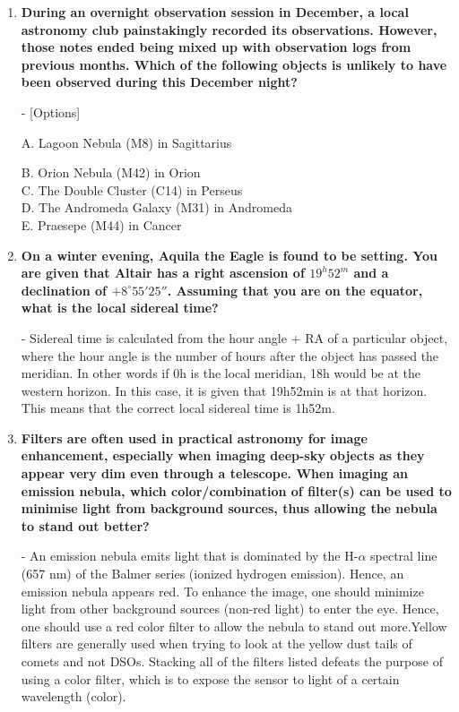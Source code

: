 \documentclass[a4paper,12pt]{extarticle}
\begin{document}
\begin{enumerate}
	
	
	\item \textbf{During an overnight observation session in December, a local astronomy club painstakingly recorded its observations. However, those notes ended being mixed up with observation logs from previous months. Which of the following objects is unlikely to have been observed during this December night?}

- [Options] 
\begin{sol}
	A. {\color{red} Lagoon Nebula (M8) in Sagittarius} \quad [$\surd$]
\end{sol}
B. Orion Nebula (M42) in Orion\\
C. The Double Cluster (C14) in Perseus\\
D. The Andromeda Galaxy (M31) in Andromeda\\
E. Praesepe (M44) in Cancer
	
\item \textbf{On a winter evening, Aquila the Eagle is found to be setting. You are given that Altair has a right ascension of $19^h52^m$ and a declination of $+8^\circ55'25''$. Assuming that you are on the equator, what is the local sidereal time?}
\begin{sol}
- Sidereal time is calculated from the hour angle + RA of a particular object, where the hour angle is the number of hours after the object has passed the meridian. In other words if 0h is the local meridian, 18h would be at the western horizon. In this case, it is given that 19h52min is at that horizon. This means that the correct local sidereal time is 1h52m. 	
\end{sol}

\item \textbf{Filters are often used in practical astronomy for image enhancement, especially when imaging deep-sky objects as they appear very dim even through a telescope. When imaging an emission nebula, which color/combination of filter(s) can be used to minimise light from background sources, thus allowing the nebula to stand out better?}

\begin{sol}
- An emission nebula emits light that is dominated by the H-$\alpha$ spectral line (657 nm) of the Balmer series (ionized hydrogen emission). Hence, an emission nebula appears red. To enhance the image, one should minimize light from other background sources (non-red light) to enter the eye. Hence,
one should use a red color filter to allow the nebula to stand out more.Yellow filters are generally used when trying to look at the yellow dust tails of comets and not DSOs. Stacking all of the filters listed defeats the purpose of using a color filter, which is to expose the sensor to light of a
certain wavelength (color).	
\end{sol}


\end{enumerate}
\end{document}
